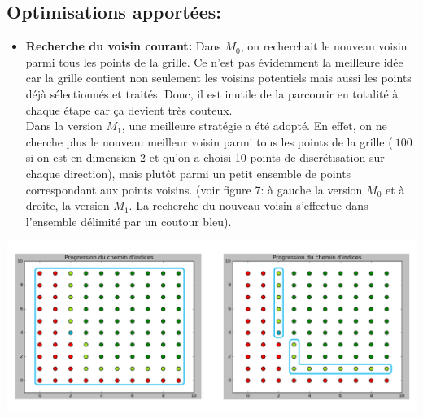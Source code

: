 \subsection{Optimisations apportées:}\label{sec:6.2}
\begin{itemize}
		\item \textbf{Recherche du voisin courant:} Dans $M_0$, on recherchait le nouveau voisin parmi tous les points de la grille.
 		Ce n'est pas évidemment la meilleure idée car la grille contient non seulement les voisins potentiels mais aussi les points déjà sélectionnés et traités.
		Donc, il est inutile de la parcourir en totalité à chaque étape car ça devient très couteux. \\
		Dans la version $M_1$, une meilleure stratégie a été adopté. En effet, on ne cherche plus le nouveau meilleur voisin parmi tous les points de la grille
		($~100$ si on est en dimension 2 et qu'on a choisi 10 points de discrétisation sur chaque direction), mais plutôt parmi un petit ensemble de points
		correspondant aux points voisins. (voir figure 7: à gauche la version $M_0$ et à droite, la version $M_1$. La recherche du nouveau voisin s'effectue dans l'ensemble
		délimité par un coutour bleu).
\end{itemize}
\begin{center}
\includegraphics[height= 9 cm,width = \linewidth]{images/algo_ai_recherch_voisin.png}
\end{center}
